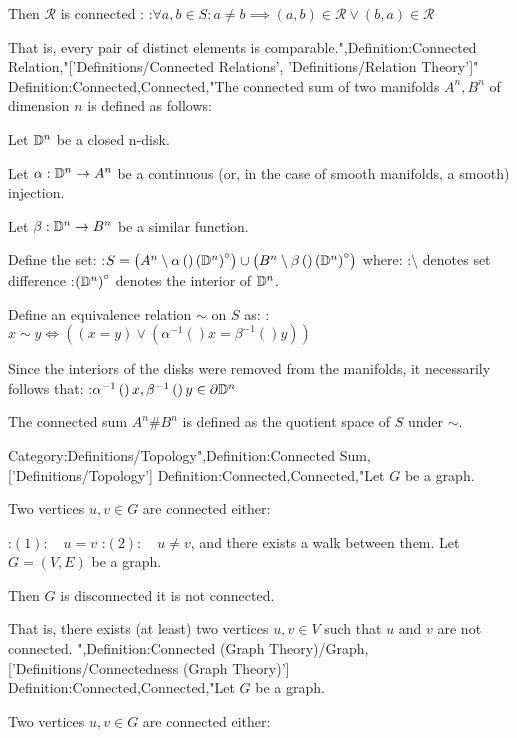 Then $\mathcal R$ is connected :
:$\forall a, b \in S: a \ne b \implies \left( a, b \right) \in \mathcal R \lor \left( b, a \right) \in \mathcal R$


That is,  every pair of distinct elements is comparable.",Definition:Connected Relation,"['Definitions/Connected Relations', 'Definitions/Relation Theory']"
Definition:Connected,Connected,"The connected sum of two manifolds $A^n, B^n$ of dimension $n$ is defined as follows:

Let $\Bbb D^n$ be a closed n-disk.

Let $\alpha: \Bbb D^n \to A^n$ be a continuous (or, in the case of smooth manifolds, a smooth) injection.

Let $\beta: \Bbb D^n \to B^n$ be a similar function.  


Define the set:
:$S = \left( A^n \setminus \alpha \left(   \right){\left( \Bbb D^n \right)^\circ}  \right) \cup \left( B^n \setminus \beta \left(   \right){\left( \Bbb D^n \right)^\circ}  \right)$
where:
:$\setminus$ denotes set difference
:$\left( \Bbb D^n \right)^\circ$ denotes the interior of $\Bbb  D^n$.


Define an equivalence relation $\sim$ on $S$ as:
:$x \sim y \iff \left( \left( x = y \right) \lor \left( \alpha^{-1}  \left(   \right)x = \beta^{-1}  \left(   \right)y \right)  \right)$


Since the interiors of the disks were removed from the manifolds, it necessarily follows that:
:$\alpha^{-1}  \left(   \right)x, \beta^{-1}  \left(   \right)y \in \partial \Bbb D^n$


The connected sum $A^n \# B^n$ is defined as the quotient space of $S$ under $\sim$.

Category:Definitions/Topology",Definition:Connected Sum,['Definitions/Topology']
Definition:Connected,Connected,"Let $G$ be a graph.

Two vertices $u, v \in G$ are connected  either:

:$(1): \quad u = v$
:$(2): \quad u \ne v$, and there exists a walk between them.
Let $G = \left( V, E \right)$ be a graph.

Then $G$ is disconnected  it is not connected.

That is,  there exists (at least) two vertices $u, v \in V$ such that $u$ and $v$ are not connected.
",Definition:Connected (Graph Theory)/Graph,['Definitions/Connectedness (Graph Theory)']
Definition:Connected,Connected,"Let $G$ be a graph.

Two vertices $u, v \in G$ are connected  either:


